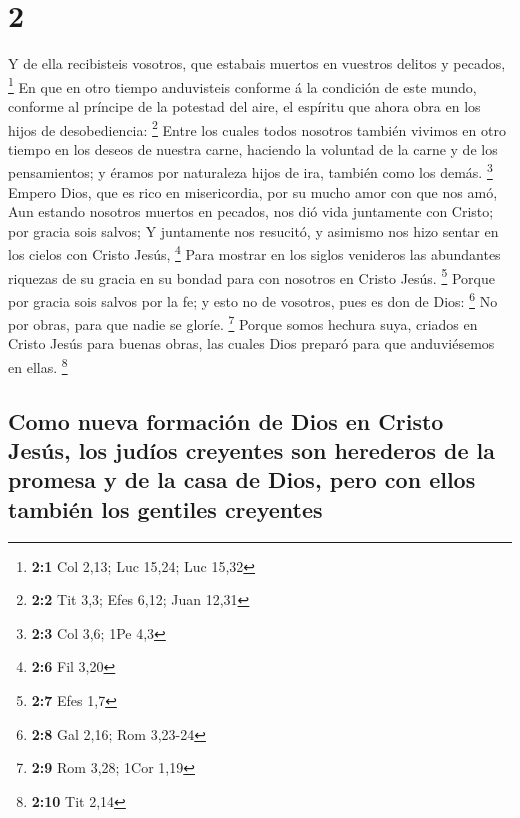 \hypertarget{section-1}{%
\section{2}\label{section-1}}

 Y de ella recibisteis vosotros, que estabais muertos en
vuestros delitos y pecados, \footnote{\textbf{2:1} Col 2,13; Luc 15,24;
  Luc 15,32}  En que en otro tiempo anduvisteis conforme á
la condición de este mundo, conforme al príncipe de la potestad del
aire, el espíritu que ahora obra en los hijos de desobediencia:
\footnote{\textbf{2:2} Tit 3,3; Efes 6,12; Juan 12,31} 
Entre los cuales todos nosotros también vivimos en otro tiempo en los
deseos de nuestra carne, haciendo la voluntad de la carne y de los
pensamientos; y éramos por naturaleza hijos de ira, también como los
demás. \footnote{\textbf{2:3} Col 3,6; 1Pe 4,3}  Empero
Dios, que es rico en misericordia, por su mucho amor con que nos amó,
 Aun estando nosotros muertos en pecados, nos dió vida
juntamente con Cristo; por gracia sois salvos;  Y juntamente
nos resucitó, y asimismo nos hizo sentar en los cielos con Cristo Jesús,
\footnote{\textbf{2:6} Fil 3,20}  Para mostrar en los siglos
venideros las abundantes riquezas de su gracia en su bondad para con
nosotros en Cristo Jesús. \footnote{\textbf{2:7} Efes 1,7} 
Porque por gracia sois salvos por la fe; y esto no de vosotros, pues es
don de Dios: \footnote{\textbf{2:8} Gal 2,16; Rom 3,23-24} 
No por obras, para que nadie se gloríe. \footnote{\textbf{2:9} Rom 3,28;
  1Cor 1,19}  Porque somos hechura suya, criados en Cristo
Jesús para buenas obras, las cuales Dios preparó para que anduviésemos
en ellas. \footnote{\textbf{2:10} Tit 2,14}

\hypertarget{como-nueva-formaciuxf3n-de-dios-en-cristo-jesuxfas-los-juduxedos-creyentes-son-herederos-de-la-promesa-y-de-la-casa-de-dios-pero-con-ellos-tambiuxe9n-los-gentiles-creyentes}{%
\subsection{Como nueva formación de Dios en Cristo Jesús, los judíos
creyentes son herederos de la promesa y de la casa de Dios, pero con
ellos también los gentiles
creyentes}\label{como-nueva-formaciuxf3n-de-dios-en-cristo-jesuxfas-los-juduxedos-creyentes-son-herederos-de-la-promesa-y-de-la-casa-de-dios-pero-con-ellos-tambiuxe9n-los-gentiles-creyentes}}

